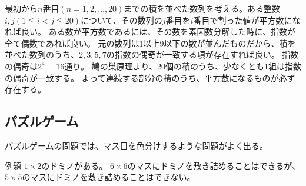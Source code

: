 \documentclass[uplatex,fleqn]{jsbook}
\begin{document}
\begin{answer}
    最初から$n$番目$(n=1,2,\dots,20)$までの積を並べた数列を考える。ある整数$i,j( 1 \leqq i < j \leqq 20 )$について、その数列の$j$番目を$i$番目で割った値が平方数になれば良い。
    ある数が平方数であるには、その数を素因数分解した時に、指数が全て偶数であれば良い。
    元の数列は1以上9以下の数が並んだものだから、積を並べた数列のうち、$2,3,5,7$の指数の偶奇が一致する項が存在すれば良い。
    指数の偶奇は$2^4=16$通り。
    鳩の巣原理より、20個の積のうち、少なくとも1組は指数の偶奇が一致する。
    よって連続する部分の積のうち、平方数になるものが必ず存在する。
\end{answer}

\subsection{パズルゲーム}

パズルゲームの問題では、マス目を色分けするような問題がよく出る。

\begin{problem}{例題}
    $1\times 2$のドミノがある。
    $6\times 6$のマスにドミノを敷き詰めることはできるが、
    $5\times 5$のマスにドミノを敷き詰めることはできない。
\end{problem}
\end{document}
